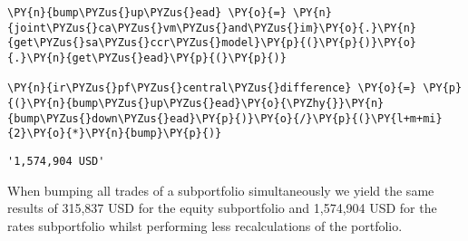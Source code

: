 \begin{tcolorbox}[breakable, size=fbox, boxrule=1pt, pad at break*=1mm,colback=cellbackground, colframe=cellborder]
\begin{Verbatim}[commandchars=\\\{\}]
\PY{n}{bump\PYZus{}up\PYZus{}ead} \PY{o}{=} \PY{n}{joint\PYZus{}ca\PYZus{}vm\PYZus{}and\PYZus{}im}\PY{o}{.}\PY{n}{get\PYZus{}sa\PYZus{}ccr\PYZus{}model}\PY{p}{(}\PY{p}{)}\PY{o}{.}\PY{n}{get\PYZus{}ead}\PY{p}{(}\PY{p}{)}

\PY{n}{ir\PYZus{}pf\PYZus{}central\PYZus{}difference} \PY{o}{=} \PY{p}{(}\PY{n}{bump\PYZus{}up\PYZus{}ead}\PY{o}{\PYZhy{}}\PY{n}{bump\PYZus{}down\PYZus{}ead}\PY{p}{)}\PY{o}{/}\PY{p}{(}\PY{l+m+mi}{2}\PY{o}{*}\PY{n}{bump}\PY{p}{)}
\end{Verbatim}
\end{tcolorbox}

            \begin{tcolorbox}[breakable, size=fbox, boxrule=.5pt, pad at break*=1mm, opacityfill=0]
\begin{Verbatim}[commandchars=\\\{\}]
'1,574,904 USD'
\end{Verbatim}
\end{tcolorbox}
        
    When bumping all trades of a subportfolio simultaneously we yield the
same results of 315,837 USD for the equity subportfolio and 1,574,904
USD for the rates subportfolio whilst performing less recalculations of
the portfolio.

    

